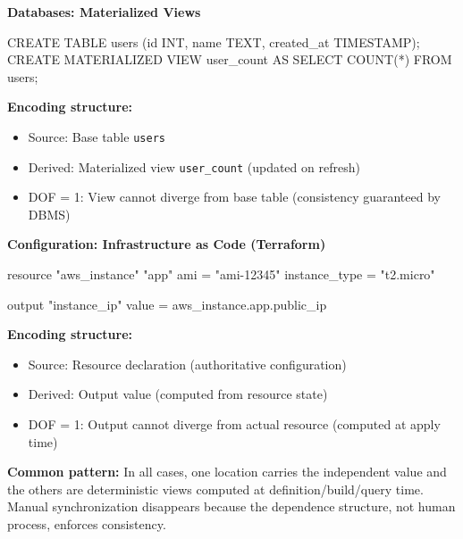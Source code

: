 \textbf{Databases: Materialized Views}

\begin{code}
CREATE TABLE users (id INT, name TEXT, created_at TIMESTAMP);
CREATE MATERIALIZED VIEW user_count AS
  SELECT COUNT(*) FROM users;
\end{code}

\textbf{Encoding structure:}
\begin{itemize}
\tightlist
\item Source: Base table \texttt{users}
\item Derived: Materialized view \texttt{user\_count} (updated on refresh)
\item DOF = 1: View cannot diverge from base table (consistency guaranteed by DBMS)
\end{itemize}

\textbf{Configuration: Infrastructure as Code (Terraform)}

\begin{code}
resource "aws_instance" "app" {
  ami = "ami-12345"
  instance_type = "t2.micro"
}

output "instance_ip" {
  value = aws_instance.app.public_ip
}
\end{code}

\textbf{Encoding structure:}
\begin{itemize}
\tightlist
\item Source: Resource declaration (authoritative configuration)
\item Derived: Output value (computed from resource state)
\item DOF = 1: Output cannot diverge from actual resource (computed at apply time)
\end{itemize}

\textbf{Common pattern:} In all cases, one location carries the independent value and the others are deterministic views computed at definition/build/query time. Manual synchronization disappears because the dependence structure, not human process, enforces consistency.

